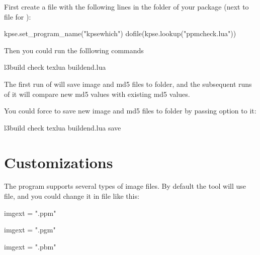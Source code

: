 \documentclass[oneside,12pt]{article}
\begin{document}
First create a  file with the following lines in the folder of your package
(next to  file for ):
\begin{codehigh}
kpse.set_program_name("kpsewhich")
dofile(kpse.lookup("ppmcheck.lua"))
\end{codehigh}
Then you could run the folllowing commands
\begin{codehigh}
l3build check
texlua buildend.lua
\end{codehigh}

The first run of  will save image and md5 files to  folder,
and the subsequent runs of it will compare new md5 values with existing md5 values.

You could force  to save new image and md5 files to  folder
by passing  option to it:
\begin{codehigh}
l3build check
texlua buildend.lua save
\end{codehigh}

\section{Customizations}

The  program supports several types of image files.
By default the  tool will use  file,
and you could change it in  file like this:
\begin{codehigh}
imgext = ".ppm"
\end{codehigh}
\begin{codehigh}
imgext = ".pgm"
\end{codehigh}
\begin{codehigh}
imgext = ".pbm"
\end{codehigh}
\end{document}
